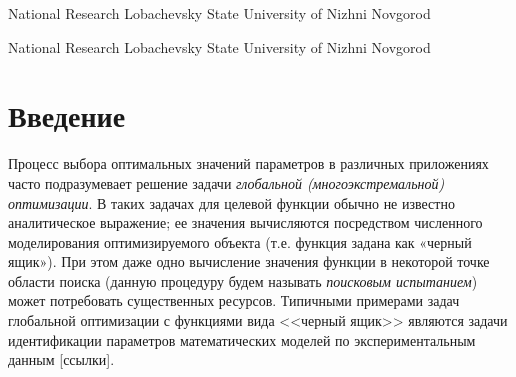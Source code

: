 \documentclass[10pt,a4paper]{book}
\begin{document}


{National Research Lobachevsky State University of Nizhni Novgorod}

{National Research Lobachevsky State University of Nizhni Novgorod}

\MakeArticleHeader

\pagebreak

\section{Введение}

Процесс выбора оптимальных значений параметров в различных приложениях часто подразумевает решение задачи \textit{глобальной (многоэкстремальной) оптимизации}. В таких задачах для целевой функции обычно не известно аналитическое выражение; ее значения вычисляются посредством численного моделирования оптимизируемого объекта (т.е. функция задана как «черный ящик»). При этом даже одно вычисление значения функции в некоторой точке области поиска (данную процедуру будем называть \textit{поисковым испытанием}) может потребовать существенных ресурсов. Типичными примерами задач глобальной оптимизации с функциями вида <<черный ящик>> являются задачи идентификации параметров математических моделей по экспериментальным данным [\colorbox[rgb]{1,1,0}{ссылки}].
\end{document}
